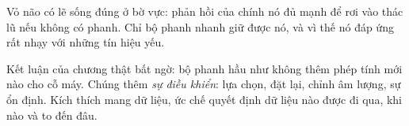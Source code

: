 Vỏ não có lẽ sống đúng ở bờ vực: phản hồi của chính nó đủ mạnh để rơi vào thác lũ nếu không có phanh. Chỉ bộ phanh nhanh giữ được nó, và vì thế nó đáp ứng rất nhạy với những tín hiệu yếu.

Kết luận của chương thật bất ngờ: bộ phanh hầu như không thêm phép tính mới nào cho cỗ máy. Chúng thêm \emph{sự điều khiển}: lựa chọn, đặt lại, chỉnh âm lượng, sự ổn định. Kích thích mang dữ liệu, ức chế quyết định dữ liệu nào được đi qua, khi nào và to đến đâu.

